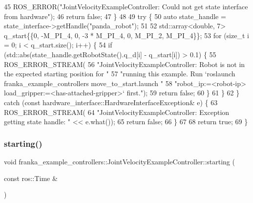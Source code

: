 \begin{DoxyCode}
45     ROS\_ERROR(\textcolor{stringliteral}{"JointVelocityExampleController: Could not get state interface from hardware"});
46     \textcolor{keywordflow}{return} \textcolor{keyword}{false};
47   \}
48 
49   \textcolor{keywordflow}{try} \{
50     \textcolor{keyword}{auto} state\_handle = state\_interface->getHandle(\textcolor{stringliteral}{"panda\_robot"});
51 
52     std::array<double, 7> q\_start\{\{0, -M\_PI\_4, 0, -3 * M\_PI\_4, 0, M\_PI\_2, M\_PI\_4\}\};
53     \textcolor{keywordflow}{for} (\textcolor{keywordtype}{size\_t} i = 0; i < q\_start.size(); i++) \{
54       \textcolor{keywordflow}{if} (std::abs(state\_handle.getRobotState().q\_d[i] - q\_start[i]) > 0.1) \{
55         ROS\_ERROR\_STREAM(
56             \textcolor{stringliteral}{"JointVelocityExampleController: Robot is not in the expected starting position for "}
57             \textcolor{stringliteral}{"running this example. Run `roslaunch franka\_example\_controllers move\_to\_start.launch "}
58             \textcolor{stringliteral}{"robot\_ip:=<robot-ip> load\_gripper:=<has-attached-gripper>` first."});
59         \textcolor{keywordflow}{return} \textcolor{keyword}{false};
60       \}
61     \}
62   \} \textcolor{keywordflow}{catch} (\textcolor{keyword}{const} hardware\_interface::HardwareInterfaceException& e) \{
63     ROS\_ERROR\_STREAM(
64         \textcolor{stringliteral}{"JointVelocityExampleController: Exception getting state handle: "} << e.what());
65     \textcolor{keywordflow}{return} \textcolor{keyword}{false};
66   \}
67 
68   \textcolor{keywordflow}{return} \textcolor{keyword}{true};
69 \}
\end{DoxyCode}
\mbox{\label{classfranka__example__controllers_1_1JointVelocityExampleController_a6f0a4d2a40e3b3fd827de7a882401a35}} 
\subsubsection{\texorpdfstring{starting()}{starting()}}
{\footnotesize\ttfamily void franka\+\_\+example\+\_\+controllers\+::\+Joint\+Velocity\+Example\+Controller\+::starting (\begin{DoxyParamCaption}\item[{const ros\+::\+Time \&}]{ }\end{DoxyParamCaption})\hspace{0.3cm}{\ttfamily [override]}}



